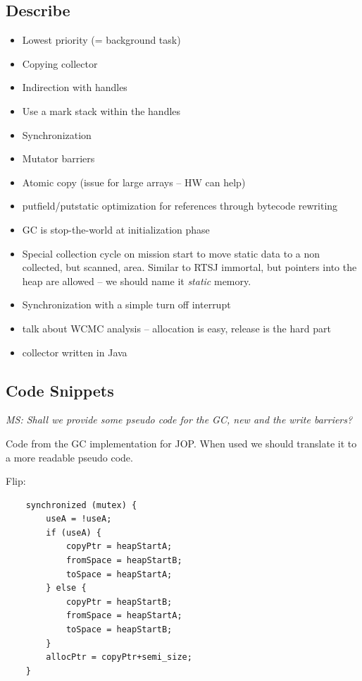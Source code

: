 \subsection{Describe}


\begin{itemize}
    \item Lowest priority (= background task)
    \item Copying collector
    \item Indirection with handles
    \item Use a mark stack within the handles
    \item Synchronization
    \item Mutator barriers
    \item Atomic copy (issue for large arrays -- HW can help)
    \item putfield/putstatic optimization for references through
    bytecode rewriting
    \item GC is stop-the-world at initialization phase
    \item Special collection cycle on mission start to move static
    data to a non collected, but scanned, area. Similar to RTSJ
    immortal, but pointers into the heap are allowed -- we should
    name it \emph{static} memory.
    \item Synchronization with a simple turn off interrupt
    \item talk about WCMC analysis -- allocation is easy, release is
    the hard part
    \item collector written in Java
\end{itemize}


\subsection{Code Snippets}

\emph{MS: Shall we provide some pseudo code for the GC, new and the
write barriers?}

Code from the GC implementation for JOP. When used we should
translate it to a more readable pseudo code.

Flip:
\begin{verbatim}
    synchronized (mutex) {
        useA = !useA;
        if (useA) {
            copyPtr = heapStartA;
            fromSpace = heapStartB;
            toSpace = heapStartA;
        } else {
            copyPtr = heapStartB;
            fromSpace = heapStartA;
            toSpace = heapStartB;
        }
        allocPtr = copyPtr+semi_size;
    }
\end{verbatim}


